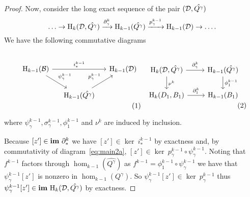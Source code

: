 \begin{proof}
  Now, consider the long exact sequence of the pair $({\mathcal{D}}, \hat{Q^\gamma})$
  \[\ldots\to\mathrm{H}_k({\mathcal{D}}, \hat{Q^\gamma})\xrightarrow{\partial^k_\gamma}
    \mathrm{H}_{k-1}(\hat{Q^\gamma})\xrightarrow{p^{k-1}_\gamma}
    \mathrm{H}_{k-1}({\mathcal{D}})\to\ldots.\]
  We have the following commutative diagrams

  \begin{small}\begin{subequations}\label{eq:main2}
  \begin{minipage}{0.5\textwidth}\begin{equation}\label{eq:main2a}\begin{tikzcd}[column sep=small]
      \hom_{k-1}(\B)\arrow{dr}{\psi_\gamma^{k-1}}\arrow{rr}{i_*^{k-1}} & &
      \hom_{k-1}(\D)\\
    & \hom_{k-1}(\hat{Q^\gamma})\arrow{ur}{p_\gamma^{k-1}}
  \end{tikzcd}\end{equation}\end{minipage}
  \begin{minipage}{0.43\textwidth}\begin{equation}\label{eq:main2b}\begin{tikzcd}
    \hom_{k}(\D, \hat{Q^\gamma})\arrow{r}{\partial_\gamma^k}\arrow{d}{\nu^k} &
    \hom_{k-1}(\hat{Q^\gamma})\arrow{d}{\phi_1^{k-1}}\\
    \hom_{k}(D_1, B_1)\arrow{r}{\partial_1^k} &
    \hom_{k-1}(B_1)
  \end{tikzcd}\end{equation}\end{minipage}
  \end{subequations}\end{small}\vspace{2ex}

  \noindent where $\psi_\gamma^{k-1}, \sigma_\gamma^{k-1}, \phi_1^{k-1}$ and $\nu^k$ are induced by inclusion.

  Because $[z']\in\mathbf{im}~\partial_*^k$ we have $[z']\in\ker~i_*^{k-1}$ by exactness and, by commutativity of diagram~\ref{eq:main2a}, $[z']\in \ker~p_\gamma^{k-1}\circ\psi_\gamma^{k-1}$.
  Noting that $f^{k-1}$ factors through $\hom_{k-1}(\hat{Q^\gamma})$ as $f^{k-1} = \phi_1^{k-1}\circ\psi_\gamma^{k-1}$ we have that $\psi_\gamma^{k-1}[z']$ is nonzero in $\hom_{k-1}(Q^\gamma)$.
  So $\psi_\gamma^{k-1}[z']\in\ker~p_\gamma^{k-1}$ thus $\psi_\gamma^{k-1}[z'] \in\mathbf{im}~\mathrm{H}_k({\mathcal{D}}, \hat{Q^\gamma})$ by exactness.


\end{proof}
